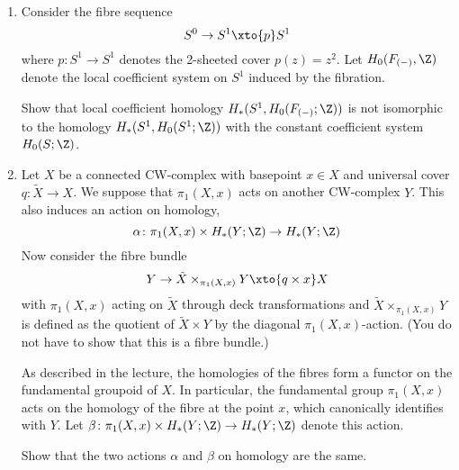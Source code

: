 \begin{exercise}
	\leavevmode
	\begin{enumerate}
		\item Consider the fibre sequence
			\begin{equation*}
				S^0 \to S^1 \xto{p} S^1
			\end{equation*}
			where $p\colon S^1 \to S^1$ denotes the 2-sheeted cover $p(z) = z^2$.
			Let $H_0(F_{({{-}})}, \Z)$ denote the local coefficient system on $S^1$ induced by the fibration.

			Show that local coefficient homology $H_*(S^1, H_0(F_{({{-}})}; \Z))$ is not isomorphic to the homology $H_*(S^1, H_0(S^1; \Z))$ with the constant coefficient system $H_0(S; \Z)$.
		\item Let $X$ be a connected CW-complex with basepoint $x \in X$ and universal cover $q\colon \tilde{X} \to X$.
			We suppose that $\pi_1(X, x)$ acts on another CW-complex $Y$.
			This also induces an action on homology,
			\begin{equation*}
				\alpha\colon \pi_1(X, x) \times H_*(Y; \Z) \to H_*(Y; \Z)
			\end{equation*}
			Now consider the fibre bundle
			\begin{equation*}
				Y \to \tilde{X} \times_{\pi_1(X, x)} Y \xto{q \times x} X
			\end{equation*}
			with $\pi_1(X, x)$ acting on $\tilde{X}$ through deck transformations and $\tilde{X} \times_{\pi_1(X, x)} Y$ is defined as the quotient of $\tilde{X} \times Y$ by the diagonal $\pi_1(X, x)$-action. 
			(You do not have to show that this is a fibre bundle.)

			As described in the lecture, the homologies of the fibres form a functor on the fundamental groupoid of $X$.
			In particular, the fundamental group $\pi_1(X, x)$ acts on the homology of the fibre at the point $x$, which canonically identifies with $Y$.
			Let $\beta\colon \pi_1(X, x) \times H_*(Y; \Z) \to H_*(Y; \Z)$ denote this action.

			Show that the two actions $\alpha$ and $\beta$ on homology are the same.
	\end{enumerate}
\end{exercise}

